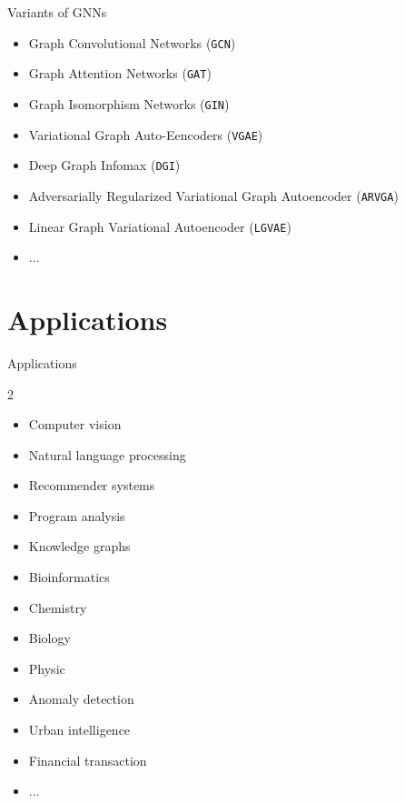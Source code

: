 \documentclass{beamer}
\begin{document}
    \begin{frame}{Variants of GNNs}
        \begin{itemize}
            \item Graph Convolutional Networks (\texttt{GCN}) \cite{kipf2016semi}
            \item Graph Attention Networks (\texttt{GAT}) \cite{velickovic2017graph}
            \item Graph Isomorphism Networks (\texttt{GIN}) \cite{xu2018powerful}
            
            \item Variational Graph Auto-Eencoders (\texttt{VGAE}) \cite{kipf2016variational}
            \item Deep Graph Infomax (\texttt{DGI}) \cite{velivckovic2018deep}
            \item Adversarially Regularized Variational Graph Autoencoder (\texttt{ARVGA}) \cite{pan2018adversarially}
            \item Linear Graph Variational Autoencoder (\texttt{LGVAE}) \cite{salha2021simple}
            \item ...
        \end{itemize}
    \end{frame}
    
\section{Applications}
    \begin{frame}{Applications}
        \begin{multicols}{2}
            \begin{itemize}
                \item Computer vision
                \item Natural language processing
                \item Recommender systems
                \item Program analysis
                \item Knowledge graphs
                \item Bioinformatics
                \item Chemistry
                \item Biology
                \item Physic
                \item Anomaly detection
                \item Urban intelligence
                \item Financial transaction
                \item ...
            \end{itemize}
        \end{multicols}          
    \end{frame}
\end{document}
